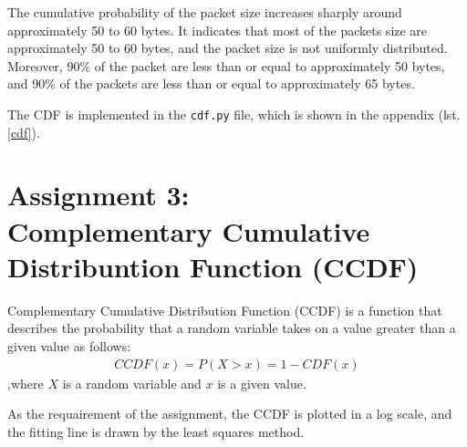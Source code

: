 \documentclass{article}
\begin{document}
The cumulative probability of the packet size increases sharply around approximately 50 to 60 bytes.
It indicates that most of the packets size are approximately 50 to 60 bytes, and the packet size is not uniformly distributed.
Moreover, 90\% of the packet are less than or equal to approximately 50 bytes, and 90\% of the packets are less than or equal to approximately 65 bytes.

The CDF is implemented in the \texttt{cdf.py} file, which is shown in the appendix (lst.\ref{cdf}).

\section{Assignment 3:\\ Complementary Cumulative Distribuntion Function (CCDF)}
Complementary Cumulative Distribution Function (CCDF) is a function that describes the probability that a random variable takes on a value greater than a given value as follows:
\begin{align}
	\mathit{CCDF}(x) = P(X > x) = 1 - \mathit{CDF}(x)
\end{align}
,where \(X\) is a random variable and \(x\) is a given value.

As the requairement of the assignment, the CCDF is plotted in a log scale, and the fitting line is drawn by the least squares method.
\end{document}
